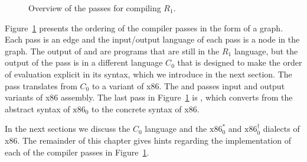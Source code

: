 \documentclass[11pt]{book}
\begin{document}
\begin{figure}[tbp]

\caption{Overview of the passes for compiling $R_1$. }
\label{fig:R1-passes}
\end{figure}

Figure~\ref{fig:R1-passes} presents the ordering of the compiler
passes in the form of a graph. Each pass is an edge and the
input/output language of each pass is a node in the graph.  The output
of  and  are programs that
are still in the $R_1$ language, but the output of the pass
 is in a different language $C_0$ that is
designed to make the order of evaluation explicit in its syntax, which
we introduce in the next section. The  pass
translates from $C_0$ to a variant of x86. The  and
 passes input and output variants of x86
assembly. The last pass in Figure~\ref{fig:R1-passes} is
, which converts from the abstract syntax of
$\text{x86}_0$ to the concrete syntax of x86.

In the next sections we discuss the $C_0$ language and the
$\text{x86}^{*}_0$ and $\text{x86}^{\dagger}_0$ dialects of x86.  The
remainder of this chapter gives hints regarding the implementation of
each of the compiler passes in Figure~\ref{fig:R1-passes}.
\end{document}
